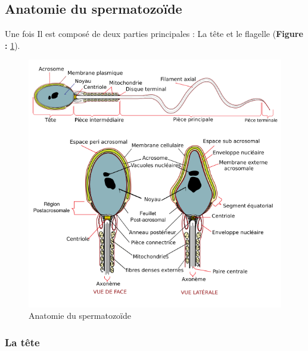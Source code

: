 \documentclass[12pt,twoside]{reedthesis}
\theoremstyle{definition}
\theoremstyle{definition}
\theoremstyle{remark}
\begin{document}
  \subsection{Anatomie du spermatozoïde}\label{anatomie-du-spermatozoide}
  
  Une fois Il est composé de deux parties principales : La tête et le
  flagelle (\textbf{Figure : }\ref{fig:spz}).
  
  \begin{figure}
  
  {\centering \includegraphics[scale=.6]{figure/spermatozoide} 
  
  }
  
  \caption[Anatomie du spermatozoïde]{Anatomie du spermatozoïde}\label{fig:spz}
  \end{figure}
  
  \subsubsection{La tête}\label{la-tete}
  
\end{document}
